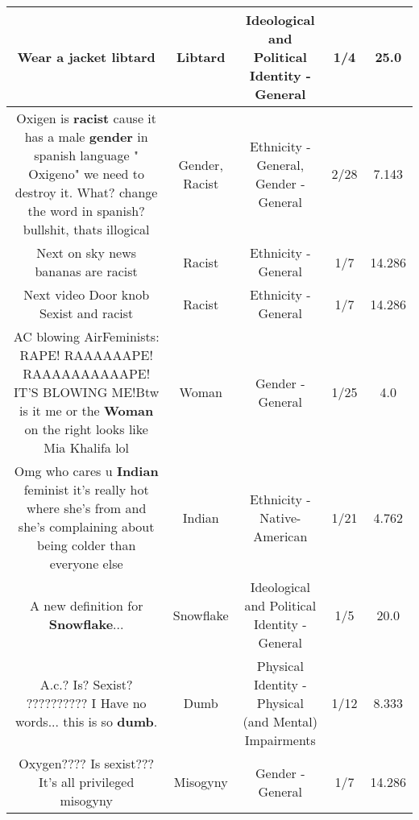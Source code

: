 \documentclass[11pt]{article}
\newlength\mylength
\begin{document}
\begin{center}
\begin{longtable}{|C{.65\mylength}|C{.30\mylength}|C{.12\mylength}|C{.12\mylength}|C{.12\mylength}|}
  \small Wear a jacket libtard\normalsize   & Libtard &  Ideological and Political Identity - General & 1/4 & 25.0 \\  \hline
  \small Oxigen is \textbf{racist} cause it has a male \textbf{gender} in spanish language " Oxigeno" we need to destroy it. What? change the word in spanish? bullshit, thats illogical\normalsize   & Gender, Racist & Ethnicity - General, Gender - General & 2/28 & 7.143 \\  \hline
  \small Next on sky news bananas are racist\normalsize   & Racist & Ethnicity - General & 1/7 & 14.286 \\  \hline
  \small Next video Door knob Sexist and racist\normalsize   & Racist & Ethnicity - General & 1/7 & 14.286 \\  \hline
  \small AC blowing AirFeminists: RAPE! RAAAAAAPE! RAAAAAAAAAAPE! IT'S BLOWING ME!Btw is it me or the \textbf{Woman} on the right looks like Mia Khalifa lol\normalsize   & Woman & Gender - General & 1/25 & 4.0 \\  \hline
  \small Omg who cares u \textbf{Indian} feminist it's really hot where she's from and she's complaining about being colder than everyone else\normalsize   & Indian & Ethnicity - Native-American & 1/21 & 4.762 \\  \hline
  \small A new definition for \textbf{Snowflake}...\normalsize   & Snowflake &  Ideological and Political Identity - General & 1/5 & 20.0 \\  \hline
  \small A.c.? Is? Sexist? ?????????? I Have no words... this is so \textbf{dumb}.\normalsize   & Dumb & Physical Identity - Physical (and Mental) Impairments & 1/12 & 8.333 \\  \hline
  \small Oxygen???? Is sexist??? It's all privileged misogyny\normalsize   & Misogyny & Gender - General & 1/7 & 14.286 \\  \hline

\end{longtable}
\end{center}
\end{document}
